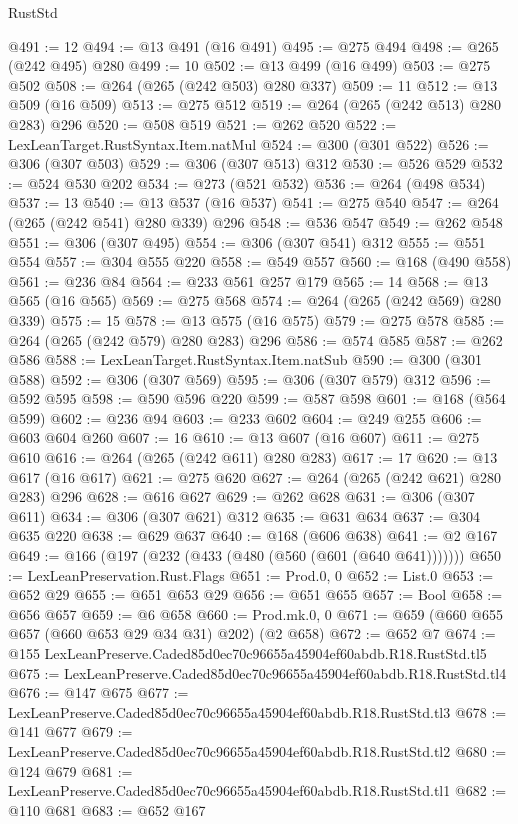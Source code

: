 \begin{lexlean}{RustStd}
\begin{coremodule}
@491 := 12
@494 := @13 @491 (@16 @491)
@495 := @275 @494
@498 := @265 (@242 @495) @280
@499 := 10
@502 := @13 @499 (@16 @499)
@503 := @275 @502
@508 := @264 (@265 (@242 @503) @280 @337)
@509 := 11
@512 := @13 @509 (@16 @509)
@513 := @275 @512
@519 := @264 (@265 (@242 @513) @280 @283) @296
@520 := @508 @519
@521 := @262 @520
@522 := LexLeanTarget.RustSyntax.Item.natMul
@524 := @300 (@301 @522)
@526 := @306 (@307 @503)
@529 := @306 (@307 @513) @312
@530 := @526 @529
@532 := @524 @530 @202
@534 := @273 (@521 @532)
@536 := @264 (@498 @534)
@537 := 13
@540 := @13 @537 (@16 @537)
@541 := @275 @540
@547 := @264 (@265 (@242 @541) @280 @339) @296
@548 := @536 @547
@549 := @262 @548
@551 := @306 (@307 @495)
@554 := @306 (@307 @541) @312
@555 := @551 @554
@557 := @304 @555 @220
@558 := @549 @557
@560 := @168 (@490 @558)
@561 := @236 @84
@564 := @233 @561 @257 @179
@565 := 14
@568 := @13 @565 (@16 @565)
@569 := @275 @568
@574 := @264 (@265 (@242 @569) @280 @339)
@575 := 15
@578 := @13 @575 (@16 @575)
@579 := @275 @578
@585 := @264 (@265 (@242 @579) @280 @283) @296
@586 := @574 @585
@587 := @262 @586
@588 := LexLeanTarget.RustSyntax.Item.natSub
@590 := @300 (@301 @588)
@592 := @306 (@307 @569)
@595 := @306 (@307 @579) @312
@596 := @592 @595
@598 := @590 @596 @220
@599 := @587 @598
@601 := @168 (@564 @599)
@602 := @236 @94
@603 := @233 @602
@604 := @249 @255
@606 := @603 @604 @260
@607 := 16
@610 := @13 @607 (@16 @607)
@611 := @275 @610
@616 := @264 (@265 (@242 @611) @280 @283)
@617 := 17
@620 := @13 @617 (@16 @617)
@621 := @275 @620
@627 := @264 (@265 (@242 @621) @280 @283) @296
@628 := @616 @627
@629 := @262 @628
@631 := @306 (@307 @611)
@634 := @306 (@307 @621) @312
@635 := @631 @634
@637 := @304 @635 @220
@638 := @629 @637
@640 := @168 (@606 @638)
@641 := @2 @167
@649 := @166 (@197 (@232 (@433 (@480 (@560 (@601 (@640 @641)))))))
@650 := LexLeanPreservation.Rust.Flags
@651 := Prod.{0, 0}
@652 := List.{0}
@653 := @652 @29
@655 := @651 @653 @29
@656 := @651 @655
@657 := Bool
@658 := @656 @657
@659 := @6 @658
@660 := Prod.mk.{0, 0}
@671 := @659 (@660 @655 @657 (@660 @653 @29 @34 @31) @202) (@2 @658)
@672 := @652 @7
@674 := @155 LexLeanPreserve.Caded85d0ec70c96655a45904ef60abdb.R18.RustStd.tl5
@675 := LexLeanPreserve.Caded85d0ec70c96655a45904ef60abdb.R18.RustStd.tl4
@676 := @147 @675
@677 := LexLeanPreserve.Caded85d0ec70c96655a45904ef60abdb.R18.RustStd.tl3
@678 := @141 @677
@679 := LexLeanPreserve.Caded85d0ec70c96655a45904ef60abdb.R18.RustStd.tl2
@680 := @124 @679
@681 := LexLeanPreserve.Caded85d0ec70c96655a45904ef60abdb.R18.RustStd.tl1
@682 := @110 @681
@683 := @652 @167

\end{coremodule}
\end{lexlean}
